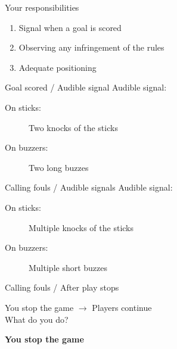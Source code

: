 \begin{frame}{Your responsibilities}
    \begin{enumerate}
        \item Signal when a goal is scored
        \item Observing any infringement of the rules
        \item Adequate positioning
    \end{enumerate}
\end{frame}

\begin{frame}{Goal scored / Audible signal}
    Audible signal:

    \begin{description}
        \item[On sticks:] Two knocks of the sticks
        \item[On buzzers:] Two long buzzes
    \end{description}
\end{frame}

\begin{frame}{Calling fouls / Audible signals}
    Audible signal:

    \begin{description}
        \item[On sticks:] Multiple knocks of the sticks
        \item[On buzzers:] Multiple short buzzes
    \end{description}
\end{frame}

\begin{frame}{Calling fouls / After play stops}
    \begin{center}
        You stop the game $\rightarrow$ Players continue \\
        What do you do? \\

        \pause{}

        \textbf{You stop the game}
    \end{center}
\end{frame}

